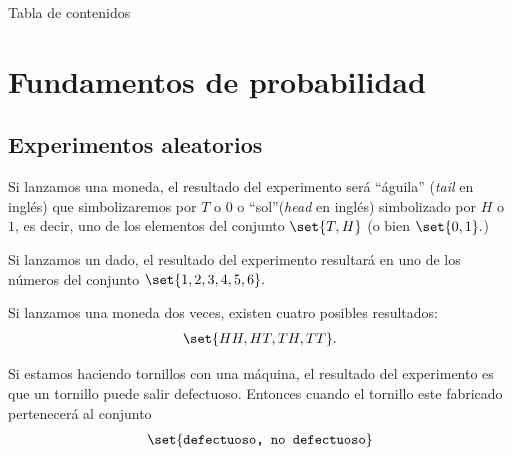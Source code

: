 
{Tabla de contenidos}
\tableofcontents


\section{Fundamentos de probabilidad}

\subsection{Experimentos aleatorios}

 \begin{ejemplo}
  \label{exmp:1.1}
  Si lanzamos una moneda, el resultado del experimento será ``águila'' (\emph{tail} en inglés) que simbolizaremos por $T$ o $0$ o ``sol''(\emph{head} en inglés) simbolizado por $H$ o $1$, es decir, uno de los elementos del conjunto $\set{T,H}$ (o bien $\set{0,1}.$)
 \end{ejemplo}



 \begin{ejemplo}
  \label{exmp:1.2}
  Si lanzamos un dado, el resultado del experimento resultará en uno de los números del conjunto $\set{1,2,3,4,5,6}.$
 \end{ejemplo}



 \begin{ejemplo}
  \label{exmp:1.3}
  Si lanzamos una moneda dos veces, existen cuatro posibles resultados:
  \begin{align*}
   \set{HH,HT,TH,TT}.
  \end{align*}

 \end{ejemplo}



 \begin{ejemplo}
  \label{exmp:1.4}
  Si estamos haciendo tornillos con una máquina, el resultado del experimento es que un tornillo puede salir defectuoso. Entonces cuando el tornillo este fabricado pertenecerá al conjunto
  \begin{align*}
   \set{\texttt{defectuoso, no defectuoso}}
  \end{align*}

 \end{ejemplo}




